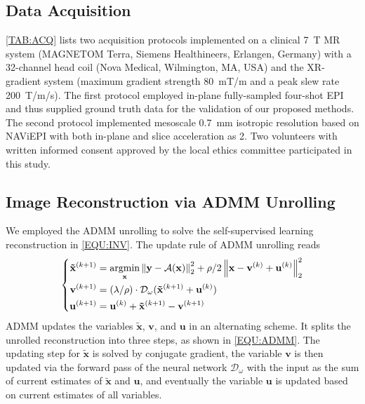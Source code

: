 \documentclass[journal,twoside,web]{ieeecolor}
\newcommand{\argmin}{\operatornamewithlimits{argmin}}
\newcommand{\norm}[1]{\left\lVert#1\right\rVert}
\begin{document}
	\subsection{Data Acquisition}

    \cref{TAB:ACQ} lists two acquisition protocols implemented on
	a clinical \SI{7}{\tesla} MR system
	(MAGNETOM Terra, Siemens Healthineers, Erlangen, Germany)
	with a 32-channel head coil (Nova Medical, Wilmington, MA, USA)
	and the XR-gradient system
	(maximum gradient strength \SI{80}{\milli\tesla/\meter} and
	a peak slew rate \SI{200}{\tesla/\meter/\second}).
    The first protocol employed in-plane fully-sampled four-shot EPI
    and thus supplied ground truth data for the validation
    of our proposed methods.
    The second protocol implemented mesoscale \SI{0.7}{mm}
    isotropic resolution based on NAViEPI
    with both in-plane and slice acceleration as 2.
    Two volunteers with written informed consent
	approved by the local ethics committee
	participated in this study.

    \subsection{Image Reconstruction via ADMM Unrolling}

    We employed the ADMM unrolling
    to solve the self-supervised learning reconstruction
    in \cref{EQU:INV}. The update rule of ADMM unrolling reads
	\begin{equation} \label{EQU:ADMM}
		\left\{\begin{aligned}
			\mathbf{\tilde{x}}^{(k+1)} &= \argmin_{\mathbf{x}} \norm{\mathbf{y} - \mathcal{A}(\mathbf{x})}_2^2 + \rho/2 \norm{ \mathbf{x} - \mathbf{v}^{(k)} + \mathbf{u}^{(k)}}_2^2 \\
			\mathbf{v}^{(k+1)} &= (\lambda/\rho) \cdot \mathcal{D}_{\omega} (\mathbf{\tilde{x}}^{(k+1)} + \mathbf{u}^{(k)}) \\
			\mathbf{u}^{(k+1)} &= \mathbf{u}^{(k)} + \mathbf{\tilde{x}}^{(k+1)} - \mathbf{v}^{(k+1)}
		\end{aligned}\right.
	\end{equation}
    ADMM updates the variables $\mathbf{\tilde{x}}$, $\mathbf{v}$,
    and $\mathbf{u}$ in an alternating scheme.
    It splits the unrolled reconstruction into three steps,
    as shown in \cref{EQU:ADMM}.
    The updating step for $\mathbf{\tilde{x}}$ is solved by
    conjugate gradient,
    the variable $\mathbf{v}$ is then updated
    via the forward pass of the neural network $\mathcal{D}_{\omega}$
    with the input as the sum of current estimates
    of $\mathbf{\tilde{x}}$ and $\mathbf{u}$,
    and eventually the variable $\mathbf{u}$ is updated
    based on current estimates of all variables.
\end{document}
